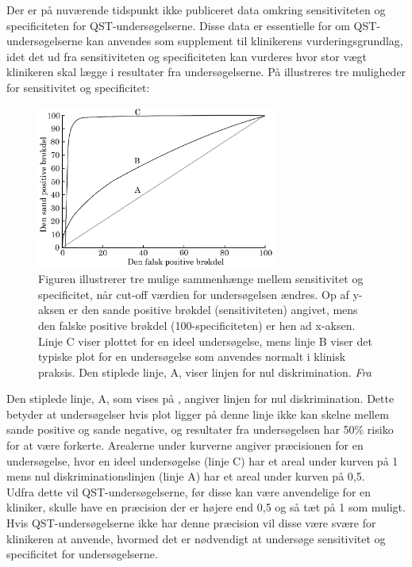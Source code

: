 Der er på nuværende tidspunkt ikke publiceret data omkring sensitiviteten og specificiteten for QST-undersøgelserne. \citep{Wylde2013} Disse data er essentielle for om QST-undersøgelserne kan anvendes som supplement til klinikerens vurderingsgrundlag, idet det ud fra sensitiviteten og specificiteten kan vurderes hvor stor vægt klinikeren skal lægge i resultater fra undersøgelserne. På  illustreres tre muligheder for sensitivitet og specificitet:

\begin{figure}[H]
\centering
\includegraphics[width=0.7\textwidth]{figures/dHTAanalyse/AUC}
\caption{Figuren illustrerer tre mulige sammenhænge mellem sensitivitet og specificitet, når cut-off værdien for undersøgelsen ændres. Op af y-aksen er den sande positive brøkdel (sensitiviteten) angivet, mens den falske positive brøkdel (100-specificiteten) er hen ad x-aksen. Linje C viser plottet for en ideel undersøgelse, mens linje B viser det typiske plot for en undersøgelse som anvendes normalt i klinisk praksis. Den stiplede linje, A, viser linjen for nul diskrimination. \textit{Fra }}\label{fig:AUC}
\end{figure}

Den stiplede linje, A, som vises på , angiver linjen for nul diskrimination. Dette betyder at undersøgelser hvis plot ligger på denne linje ikke kan skelne mellem sande positive og sande negative, og resultater fra undersøgelsen har 50\% risiko for at være forkerte. Arealerne under kurverne angiver præcisionen for en undersøgelse, hvor en ideel undersøgelse (linje C) har et areal under kurven på 1 mens nul diskriminationslinjen (linje A) har et areal under kurven på 0,5. \\
Udfra dette vil QST-undersøgelserne, før disse kan være anvendelige for en kliniker, skulle have en præcision der er højere end 0,5 og så tæt på 1 som muligt. Hvis QST-undersøgelserne ikke har denne præcision vil disse være svære for klinikeren at anvende, hvormed det er nødvendigt at undersøge sensitivitet og specificitet for undersøgelserne.   

